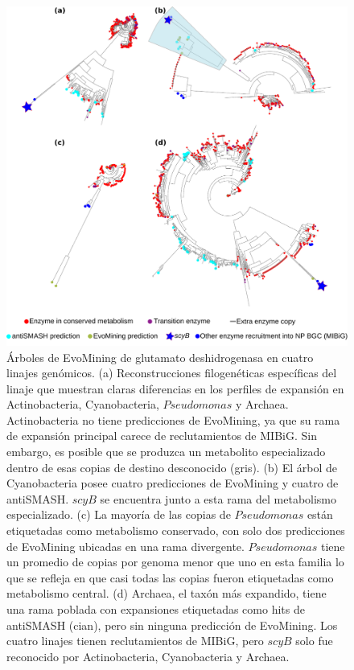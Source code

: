 \documentclass[12pt,twoside]{reedthesis}
\begin{document}
  \begin{figure}[h!tbp]
  \centering
  \includegraphics[angle = 0,scale = .8]{chapter2/FigurasPaper/Figure4.pdf}
  \caption[Árboles de EvoMining de glutamato deshidrogenasa en cuatro linajes genómicos]{\footnotesize{Árboles de EvoMining de glutamato deshidrogenasa en cuatro linajes genómicos. (a) Reconstrucciones filogenéticas específicas del linaje que muestran claras diferencias en los perfiles de expansión en Actinobacteria, Cyanobacteria, $Pseudomonas$ y Archaea. Actinobacteria no tiene predicciones de EvoMining, ya que su rama de expansión principal carece de reclutamientos de MIBiG. Sin embargo, es posible que se produzca un metabolito especializado dentro de esas copias de destino desconocido (gris). (b) El árbol de Cyanobacteria posee cuatro predicciones de EvoMining y cuatro de antiSMASH. $scyB$ se encuentra junto a esta rama del metabolismo especializado. (c) La mayoría de las copias de $Pseudomonas$ están etiquetadas como metabolismo conservado, con solo dos predicciones de EvoMining ubicadas en una rama divergente. $Pseudomonas$ tiene un promedio de copias por genoma menor que uno en esta familia lo que se refleja en que casi todas las copias fueron etiquetadas como metabolismo central. (d) Archaea, el taxón más expandido, tiene una rama poblada con expansiones etiquetadas como hits de antiSMASH (cian), pero sin ninguna predicción de EvoMining. Los cuatro linajes tienen reclutamientos de MIBiG, pero $scyB$ solo fue reconocido por Actinobacteria, Cyanobacteria y Archaea. }}
  \label{fig:GenomicLinajes}
  \end{figure}
  
\end{document}
